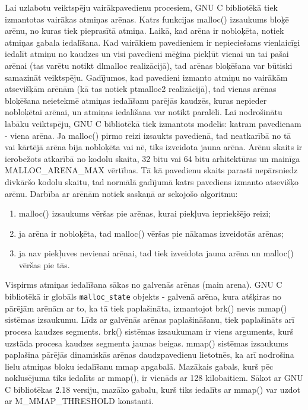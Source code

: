 Lai uzlabotu veiktspēju vairākpavedienu procesiem, GNU C bibliotēkā tiek izmantotas vairākas atmiņas arēnas. 
Katrs funkcijas malloc() izsaukums bloķē arēnu, no kuras tiek pieprasītā atmiņa. 
Laikā, kad arēna ir nobloķēta, notiek atmiņas gabala iedalīšana.
Kad vairākiem pavedieniem ir nepieciešams vienlaicīgi iedalīt atmiņu no kaudzes un visi pavedieni mēģina piekļūt vienai un tai pašai arēnai (tas varētu notikt dlmalloc realizācijā), tad arēnas bloķēšana var būtiski samazināt veiktspēju.
Gadījumos, kad pavedieni izmanto atmiņu no vairākām atsevišķām arēnām (kā tas notiek ptmalloc2 realizācijā), tad vienas arēnas bloķēšana neietekmē atmiņas iedalīšanu parējās kaudzēs, kuras nepieder nobloķētai arēnai, un atmiņas iedalīšana var notikt paralēli.
Lai nodrošinātu labāku veiktspēju, GNU C bibliotēkā tiek izmantots modelis: katram pavedienam - viena arēna. 
Ja malloc() pirmo reizi izsaukts pavedienā, tad neatkarībā no tā vai kārtējā arēna bija nobloķēta vai nē, tiks izveidota jauna arēna.
Arēnu skaits ir ierobežots atkarībā no kodolu skaita, 32 bitu vai 64 bitu arhitektūras un mainīga MALLOC\_ARENA\_MAX vērtības.
Tā kā pavedienu skaits parasti nepārsniedz divkāršo kodolu skaitu, tad normālā gadījumā katrs pavediens izmanto atsevišķo arēnu. 
Darbība ar arēnām notiek saskaņā ar sekojošo algoritmu: 
\begin{enumerate}
\item malloc() izsaukums vēršas pie arēnas, kurai piekļuva iepriekšējo reizi;
\item ja arēna ir nobloķēta, tad malloc() vēršas pie nākamas izveidotās arēnas;
\item ja nav piekļuves nevienai arēnai, tad tiek izveidota jauna arēna un malloc() vēršas pie tās.
\end{enumerate}

Vispirms atmiņas iedalīšana sākas no galvenās arēnas (main arena). 
GNU C bibliotēkā ir globāls \texttt{malloc\_state} objekts - galvenā arēna, kura atšķiras no pārējām arēnām ar to, ka tā tiek paplašināta, izmantojot brk() nevis  mmap() sistēmas izsaukumu. 
Līdz ar galvēnās arēnas paplašināšanu, tiek paplašināts arī procesa kaudzes segments.
brk() sistēmas izsaukumam ir viens arguments, kurš uzstāda procesa kaudzes segmenta jaunas beigas.
mmap() sistēmas izsaukums paplašina pārējās dinamiskās arēnas daudzpavedienu lietotnēs, ka arī nodrošina lielu atmiņas bloku iedalīšanu mmap apgabalā.
Mazākais gabals, kurš pēc noklusējuma tiks iedalīts ar mmap(), ir vienāds ar 128 kilobaitiem. 
Sākot ar GNU C bibliotēkas 2.18 versiju, mazāko gabalu, kurš tiks iedalīts ar mmap() var uzdot ar M\_MMAP\_THRESHOLD konstanti.





